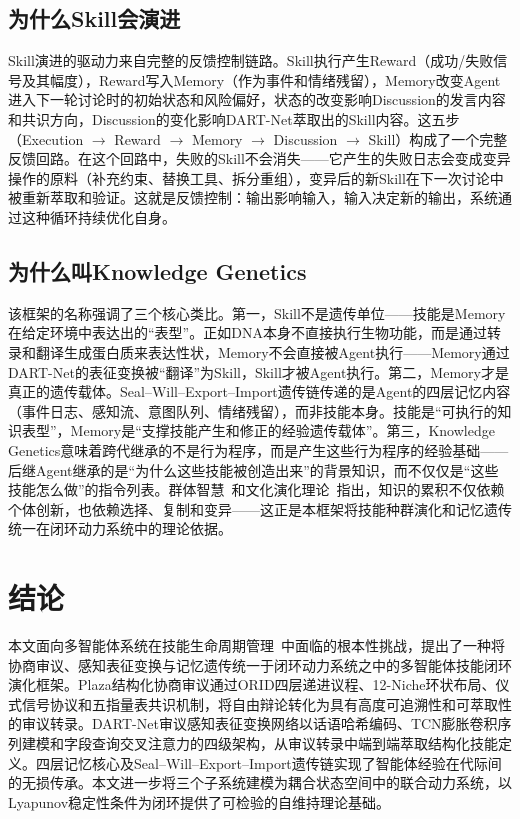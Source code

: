 \documentclass[12pt,a4paper]{ctexart}
\begin{document}
\subsection{为什么Skill会演进}

Skill演进的驱动力来自完整的反馈控制链路。Skill执行产生Reward（成功/失败信号及其幅度），Reward写入Memory（作为事件和情绪残留），Memory改变Agent进入下一轮讨论时的初始状态和风险偏好，状态的改变影响Discussion的发言内容和共识方向，Discussion的变化影响DART-Net萃取出的Skill内容。这五步（Execution $\to$ Reward $\to$ Memory $\to$ Discussion $\to$ Skill）构成了一个完整反馈回路。在这个回路中，失败的Skill不会消失——它产生的失败日志会变成变异操作的原料（补充约束、替换工具、拆分重组），变异后的新Skill在下一次讨论中被重新萃取和验证。这就是反馈控制：输出影响输入，输入决定新的输出，系统通过这种循环持续优化自身。

\subsection{为什么叫Knowledge Genetics}

该框架的名称强调了三个核心类比。第一，Skill不是遗传单位——技能是Memory在给定环境中表达出的“表型”。正如DNA本身不直接执行生物功能，而是通过转录和翻译生成蛋白质来表达性状，Memory不会直接被Agent执行——Memory通过DART-Net的表征变换被“翻译”为Skill，Skill才被Agent执行。第二，Memory才是真正的遗传载体。Seal--Will--Export--Import遗传链传递的是Agent的四层记忆内容（事件日志、感知流、意图队列、情绪残留），而非技能本身。技能是“可执行的知识表型”，Memory是“支撑技能产生和修正的经验遗传载体”。第三，Knowledge Genetics意味着跨代继承的不是行为程序，而是产生这些行为程序的经验基础——后继Agent继承的是“为什么这些技能被创造出来”的背景知识，而不仅仅是“这些技能怎么做”的指令列表。群体智慧~\cite{bonabeau1999swarm,theraulaz1998modeling}和文化演化理论~\cite{boyd1985culture,laland2015extended}指出，知识的累积不仅依赖个体创新，也依赖选择、复制和变异——这正是本框架将技能种群演化和记忆遗传统一在闭环动力系统中的理论依据。

\section{结论}

本文面向多智能体系统在技能生命周期管理~\cite{skill_pseudocode2025,skill_comprehension2025}中面临的根本性挑战，提出了一种将协商审议、感知表征变换与记忆遗传统一于闭环动力系统之中的多智能体技能闭环演化框架。Plaza结构化协商审议通过ORID四层递进议程、12-Niche环状布局、仪式信号协议和五指量表共识机制，将自由辩论转化为具有高度可追溯性和可萃取性的审议转录。DART-Net审议感知表征变换网络以话语哈希编码、TCN膨胀卷积序列建模和字段查询交叉注意力的四级架构，从审议转录中端到端萃取结构化技能定义。四层记忆核心及Seal--Will--Export--Import遗传链实现了智能体经验在代际间的无损传承。本文进一步将三个子系统建模为耦合状态空间中的联合动力系统，以Lyapunov稳定性条件为闭环提供了可检验的自维持理论基础。
\end{document}
